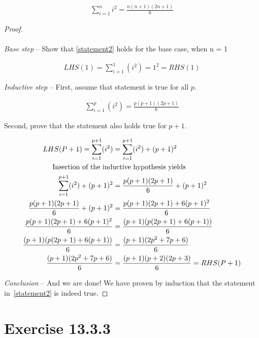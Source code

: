 \documentclass{article}
\begin{document}
\begin{align}
    \label{statement2}
    \sum_{i=1}^{n} i^2 = \frac{n(n+1)(2n+1)}{6}
\end{align}

\begin{proof}

\textit{\\\\Base step} -- Show that \cref{statement2} holds for the base case, when n = 1

\begin{align}
    \label{basestep}
    LHS(1) = \sum_{i=1}^{1}(i^2) = 1^2 = RHS(1)
\end{align}

\textit{Inductive step} -- First, assume that statement is true for all $p$.

\begin{align}
    \label{assumption}
    \sum_{i=1}^{p} (i^2) = \frac{p(p+1)(2p+1)}{6} 
\end{align}

Second, prove that the statement also holds true for $p+1$.

\begin{align}
    \label{proof}
    LHS(P+1) = \sum_{i=1}^{p+1} (i^2) &= \sum_{i=1}^{p+1} (i^2) + (p+1)^2\notag\\
    &\hspace{-3cm} \text{Insertion of the inductive hypothesis yields}\notag\\
    \sum_{i=1}^{p+1} (i^2) + (p+1)^2 &= \frac{p(p+1)(2p+1)}{6} + (p+1)^2\notag\\
    \frac{p(p+1)(2p+1)}{6} + (p+1)^2 &= \frac{p(p+1)(2p+1) + 6(p+1)^2}{6}\notag\\
    \frac{p(p+1)(2p+1) + 6(p+1)^2}{6} &= \frac{(p+1)(p(2p+1) + 6(p+1))}{6}\notag\\
    \frac{(p+1)(p(2p+1) + 6(p+1))}{6} &= \frac{(p+1)(2p^2 + 7p + 6)}{6}\notag\\
    \frac{(p+1)(2p^2 + 7p + 6)}{6} &= \frac{(p+1)(p+2)(2p+3)}{6} = RHS(P+1)
\end{align}

\textit{Conclusion} -- And we are done! We have proven by induction that the statement in~\cref{statement2} is indeed true.

\end{proof}

\section{Exercise 13.3.3}
\end{document}
